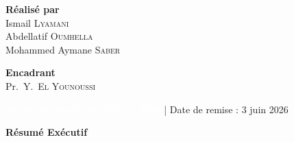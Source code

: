 \documentclass[12pt,a4paper]{article}
\begin{document}
\begin{titlepage}
\begin{center}
    \vspace{1.1cm}

    \begin{minipage}[t]{0.50\paperwidth}
      \begin{tcolorbox}[
        enhanced, arc=3mm, boxrule=1pt,
        colframe=ENSAblue, colback=lightblue,
        left=4mm, right=4mm, top=3mm, bottom=3mm
      ]
        \centering
        \textcolor{ENSAblue}{\bfseries\large Réalisé par}\\[0.25cm]
        {\normalsize
          Ismail \textsc{Lyamani}\\[0.12cm]
          Abdellatif \textsc{Oumhella}\\[0.12cm]
          Mohammed Aymane \textsc{Saber}%
        }
      \end{tcolorbox}

      \vspace{0.3cm}

      \begin{tcolorbox}[
        enhanced, arc=3mm, boxrule=1pt,
        colframe=ENSAblue, colback=lightblue,
        left=4mm, right=4mm, top=3mm, bottom=3mm
      ]
        \centering
        \textcolor{ENSAblue}{\bfseries\large Encadrant}\\[0.25cm]
        {\normalsize Pr.~Y.~\textsc{El Younoussi}}
      \end{tcolorbox}
    \end{minipage}

  \end{center}

  \vfill

  \noindent\colorbox{ENSAblue}{%
    \parbox[c][2.0cm]{\paperwidth}{%
      \centering
      \textcolor{white}{\large\bfseries Année universitaire 2025 -- 2026}%
      \quad\textcolor{white!50!ENSAblue}{\large|}%
      \quad\textcolor{white!75!ENSAblue}{\normalsize Date de remise : 3 juin 2026}%
    }%
  }

  \restoregeometry
\end{titlepage}

\newpage
\thispagestyle{plain}
\begin{center}
  {\Large\bfseries\color{ENSAblue} Résumé Exécutif}
\end{center}
\vspace{0.3cm}
\end{document}
